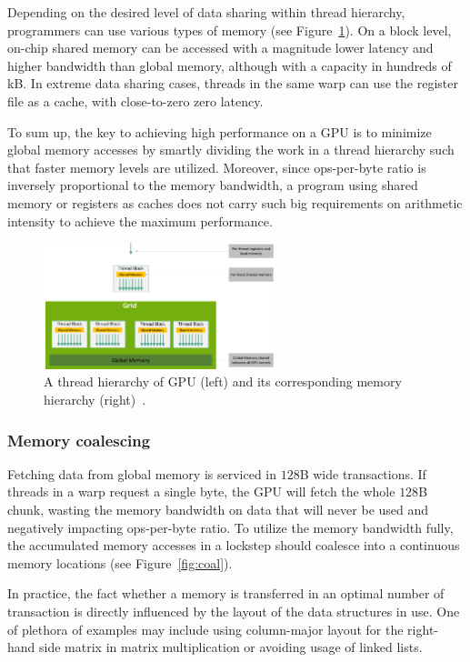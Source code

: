 Depending on the desired level of data sharing within thread hierarchy, programmers can use various types of memory (see Figure~\ref{fig:mem-hierarchy}). On a block level, on-chip shared memory can be accessed with a magnitude lower latency and higher bandwidth than global memory, although with a capacity in hundreds of kB. In extreme data sharing cases, threads in the same warp can use the register file as a cache, with close-to-zero zero latency.

To sum up, the key to achieving high performance on a GPU is to minimize global memory accesses by smartly dividing the work in a thread hierarchy such that faster memory levels are utilized. Moreover, since ops-per-byte ratio is inversely proportional to the memory bandwidth, a program using shared memory or registers as caches does not carry such big requirements on arithmetic intensity to achieve the maximum performance.

\begin{figure}
    \centering
    \includegraphics[width=0.6\textwidth]{img/mem-hierarchy-2.png}
    \caption{A thread hierarchy of GPU (left) and its corresponding memory hierarchy (right)~\cite{site:cuda}.}
    \label{fig:mem-hierarchy}
\end{figure}

\subsubsection{Memory coalescing}
\label{sec:coalescing}

Fetching data from global memory is serviced in $128$B wide transactions. If threads in a warp request a single byte, the GPU will fetch the whole $128$B chunk, wasting the memory bandwidth on data that will never be used and negatively impacting ops-per-byte ratio. To utilize the memory bandwidth fully, the accumulated memory accesses in a lockstep should coalesce into a continuous memory locations (see Figure~\ref{fig:coal}).

In practice, the fact whether a memory is transferred in an optimal number of transaction is directly influenced by the layout of the data structures in use. One of plethora of examples may include using column-major layout for the right-hand side matrix in matrix multiplication or avoiding usage of linked lists.

